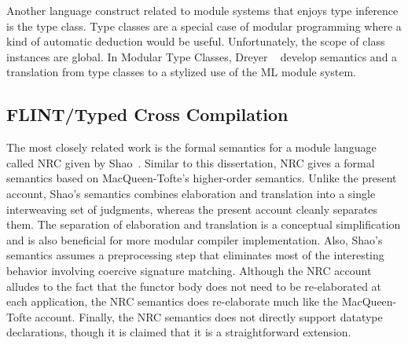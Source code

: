 	Another language construct related to module systems that enjoys type inference is the type class. Type classes are a special case of modular programming where a kind of automatic deduction would be useful. Unfortunately, the scope of class instances are global. In Modular Type Classes, Dreyer \etal~ \cite{dhck07} develop semantics and a translation from type classes to a stylized use of the ML module system. 

\subsection{FLINT/Typed Cross Compilation}
The most closely related work is the formal semantics for a module
language called NRC given by
Shao~\cite{shao98}. Similar to this dissertation, NRC gives a formal semantics based on MacQueen-Tofte's
higher-order semantics. Unlike the present account, Shao's semantics
combines elaboration and translation into a single interweaving set of
judgments, whereas the present account cleanly separates them. The
separation of elaboration and translation is a conceptual
simplification and is also beneficial for more modular compiler
implementation. Also, Shao's semantics assumes a preprocessing step
that eliminates most of the interesting behavior involving coercive signature
matching. Although the NRC account alludes to the fact that the
functor body does not need to be re-elaborated at each application,
the NRC semantics does re-elaborate much like the MacQueen-Tofte
account. Finally, the NRC semantics does not directly support
datatype declarations, though it is claimed that it is a
straightforward extension. 

